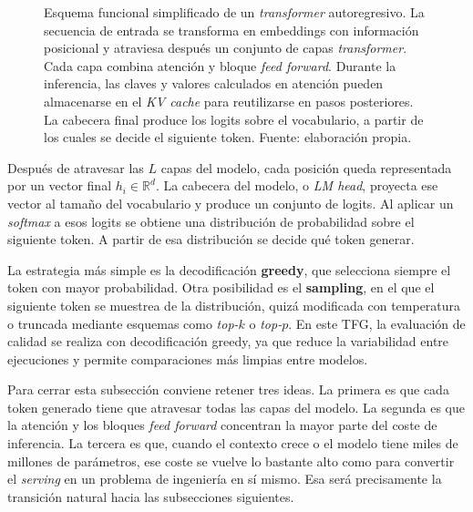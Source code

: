 \begin{figure}[H]
\caption{Esquema funcional simplificado de un \textit{transformer} autoregresivo. La secuencia de entrada se transforma en embeddings con información posicional y atraviesa después un conjunto de capas \textit{transformer}. Cada capa combina atención y bloque \textit{feed forward}. Durante la inferencia, las claves y valores calculados en atención pueden almacenarse en el \textit{KV cache} para reutilizarse en pasos posteriores. La cabecera final produce los logits sobre el vocabulario, a partir de los cuales se decide el siguiente token. Fuente: elaboración propia.}
\label{fig:transformer_pipeline_clean}
\end{figure}

Después de atravesar las $L$ capas del modelo, cada posición queda representada por un vector final $h_i \in \mathbb{R}^{d}$. La cabecera del modelo, o \textit{LM head}, proyecta ese vector al tamaño del vocabulario y produce un conjunto de logits. Al aplicar un \textit{softmax} a esos logits se obtiene una distribución de probabilidad sobre el siguiente token. A partir de esa distribución se decide qué token generar.

La estrategia más simple es la decodificación \textbf{greedy}, que selecciona siempre el token con mayor probabilidad. Otra posibilidad es el \textbf{sampling}, en el que el siguiente token se muestrea de la distribución, quizá modificada con temperatura o truncada mediante esquemas como \textit{top-$k$} o \textit{top-$p$}. En este TFG, la evaluación de calidad se realiza con decodificación greedy, ya que reduce la variabilidad entre ejecuciones y permite comparaciones más limpias entre modelos.

Para cerrar esta subsección conviene retener tres ideas. La primera es que cada token generado tiene que atravesar todas las capas del modelo. La segunda es que la atención y los bloques \textit{feed forward} concentran la mayor parte del coste de inferencia. La tercera es que, cuando el contexto crece o el modelo tiene miles de millones de parámetros, ese coste se vuelve lo bastante alto como para convertir el \textit{serving} en un problema de ingeniería en sí mismo. Esa será precisamente la transición natural hacia las subsecciones siguientes.

